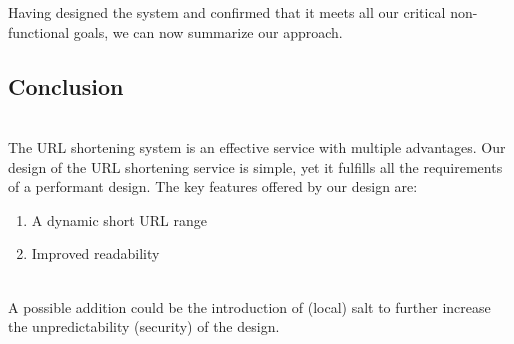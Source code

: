 Having designed the system and confirmed that it meets all our critical non-functional goals, we can now summarize our approach.

\subsection{Conclusion}\label{UFF3hs91wOZD7xb67eHWS}
\\
The URL shortening system is an effective service with multiple advantages. Our design of the URL shortening service is simple, yet it fulfills all the requirements of a performant design. The key features offered by our design are:

\begin{enumerate}
\item
\protect{}\label{LGviXdgyDmNBU71yM47OR}
A dynamic short URL range
\item
\protect{}\label{YKadlR_5_NmRtIgp5vYUi}
Improved readability
\end{enumerate}
\\
A possible addition could be the introduction of (local) salt to further increase the unpredictability (security) of the design.

